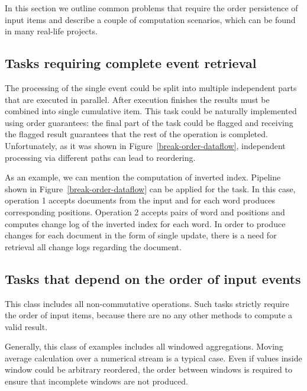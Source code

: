 
\label {fs-tasks}

In this section we outline common problems that require the order persistence of input items and describe a couple of computation scenarios, which can be found in many real-life projects.

\subsection{Tasks requiring complete event retrieval}
The processing of the single event could be split into multiple independent parts that are executed in parallel. After execution finishes the results must be combined into single cumulative item. This task could be naturally implemented using order guarantees: the final part of the task could be flagged and receiving the flagged result guarantees that the rest of the operation is completed. Unfortunately, as it was shown in Figure~\ref{break-order-dataflow}, independent processing via different paths can lead to reordering.

As an example, we can mention the computation of inverted index. Pipeline shown in Figure~\ref{break-order-dataflow} can be applied for the task. In this case, operation 1 accepts documents from the input and for each word produces corresponding positions. Operation 2 accepts pairs of word and positions and computes change log of the inverted index for each word. In order to produce changes for each document in the form of single update, there is a need for retrieval all change logs regarding the document.

\subsection{Tasks that depend on the order of input events}
This class includes all non-commutative operations. Such tasks strictly require the order of input items, because there are no any other methods to compute a valid result.

Generally, this class of examples includes all windowed aggregations. Moving average calculation over a numerical stream is a typical case. Even if values inside window could be arbitrary reordered, the order between windows is required to ensure that incomplete windows are not produced.